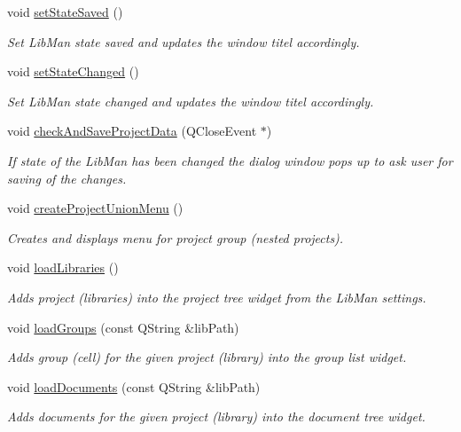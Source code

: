 \begin{DoxyCompactItemize}
void \hyperlink{classMainWindow_a5fb61a8cf4108faeb224c8f2d99b6ee3}{set\-State\-Saved} ()
\begin{DoxyCompactList}\small\item\em Set Lib\-Man state saved and updates the window titel accordingly. \end{DoxyCompactList}\item 
void \hyperlink{classMainWindow_a281bfe571e3ce2af52bf79bb4fa44fde}{set\-State\-Changed} ()
\begin{DoxyCompactList}\small\item\em Set Lib\-Man state changed and updates the window titel accordingly. \end{DoxyCompactList}\item 
void \hyperlink{classMainWindow_a8c2508cb0a54eab87a3c5c5471676f4a}{check\-And\-Save\-Project\-Data} (Q\-Close\-Event $\ast$)
\begin{DoxyCompactList}\small\item\em If state of the Lib\-Man has been changed the dialog window pops up to ask user for saving of the changes. \end{DoxyCompactList}\item 
void \hyperlink{classMainWindow_aff15de0c74551acef80d0a588c254b7e}{create\-Project\-Union\-Menu} ()
\begin{DoxyCompactList}\small\item\em Creates and displays menu for project group (nested projects). \end{DoxyCompactList}\item 
void \hyperlink{classMainWindow_a63962c76c33dd60e0b354dd48724a9f5}{load\-Libraries} ()
\begin{DoxyCompactList}\small\item\em Adds project (libraries) into the project tree widget from the Lib\-Man settings. \end{DoxyCompactList}\item 
void \hyperlink{classMainWindow_a57bf47c514d40fcbc2cc301599fd419e}{load\-Groups} (const Q\-String \&lib\-Path)
\begin{DoxyCompactList}\small\item\em Adds group (cell) for the given project (library) into the group list widget. \end{DoxyCompactList}\item 
void \hyperlink{classMainWindow_a953304e2b85e660d11bb875f5e9f3738}{load\-Documents} (const Q\-String \&lib\-Path)
\begin{DoxyCompactList}\small\item\em Adds documents for the given project (library) into the document tree widget. \end{DoxyCompactList}\item 

\end{DoxyCompactItemize}

